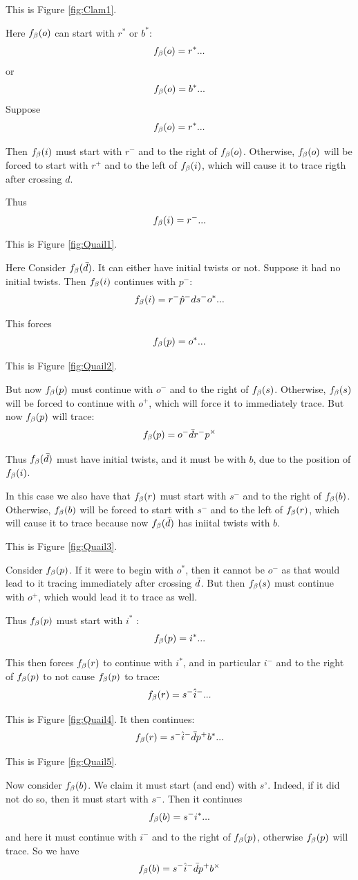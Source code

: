  

This is Figure \ref{fig:Clam1}.

Here $f_\beta(o)$ can start with $r^*$ or $b^*$:
\[
f_\beta(o) = r^*...
\]
or
\[
f_\beta(o) = b^*...
\]
\label{Quail}
Suppose
\[
f_\beta(o) = r^*...
\]

Then $f_\beta(i)$ must start with $r^-$ and to the right of $f_\beta(o)$. Otherwise, $f_\beta(o)$ will be forced to start with $r^+$ and to the left of $f_\beta(i)$, which will cause it to trace rigth after crossing $d$.

Thus
\[
f_\beta(i) = r^-...
\]

This is Figure \ref{fig:Quail1}.

Here Consider $f_\beta(\bar{d})$. It can either have initial twists or not. Suppose it had no initial twists. Then $f_\beta(i)$ continues with $p^-$:
\[
f_\beta(i) = r^- \hat{p}^- d s^- o^*...
\]

This forces
\[
f_\beta(p) = o^*...
\]

This is Figure \ref{fig:Quail2}.


But now $f_\beta(p)$ must continue with $o^-$ and to the right of $f_\beta(s)$. Otherwise, $f_\beta(s)$ will be forced to continue with $o^+$, which will force it to immediately trace. But now $f_\beta(p)$ will trace:
\[
f_\beta(p) = o^- \bar{d} r^- p^\times
\]


Thus $f_\beta(\bar{d})$ must have initial twists, and it must be with $b$, due to the position of $f_\beta(i)$.

In this case we also have that $f_\beta(r)$ must start with $s^-$ and to the right of $f_\beta(b)$. Otherwise, $f_\beta(b)$ will be forced to start with $s^-$ and to the left of $f_\beta(r)$, which will cause it to trace because now $f_\beta(\bar{d})$ has iniital twists with $b$.

This is Figure \ref{fig:Quail3}.

Consider $f_\beta(p)$. If it were to begin with $o^*$, then it cannot be $o^-$ as that would lead to it tracing immediately after crossing $\bar{d}$. But then $f_\beta(s)$ must continue with $o^+$, which would lead it to trace as well. 

Thus $f_\beta(p)$ must start with $i^*$
:
\[
f_\beta(p) = i^*...
\]

This then forces $f_\beta(r)$ to continue with $i^*$, and in particular $i^-$ and to the right of $f_\beta(p)$ to not cause $f_\beta(p)$ to trace:
\[
f_\beta(r) = s^- \hat{i}^-...
\]

This is Figure \ref{fig:Quail4}. It then continues:
\[
f_\beta(r) = s^- \hat{i}^- \bar{d} p^+ b^*...
\]

This is Figure \ref{fig:Quail5}.

Now consider $f_\beta(b)$. We claim it must start (and end) with $s^\circ$. Indeed, if it did not do so, then it must start with $s^-$. Then it continues
\[
f_\beta(b) = s^- i^*...
\]
and here it must continue with $i^-$ and to the right of $f_\beta(p)$, otherwise $f_\beta(p)$ will trace. So we have
\[
f_\beta(b) = s^- \hat{i}^- \bar{d} p^+ b^\times
\]

